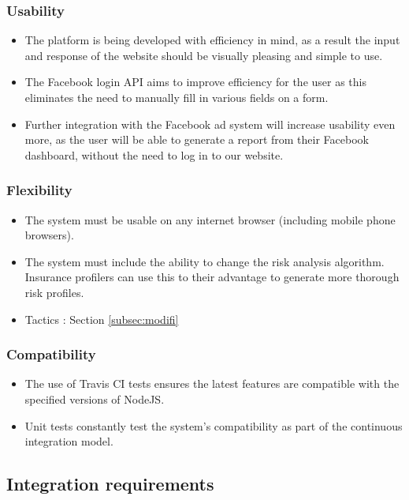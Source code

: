 \documentclass{article}
\begin{document}
		\subsubsection{Usability}
		\begin{itemize}
			\item The platform is being developed with efficiency in mind, as a result the input and response of the website should be visually pleasing and simple to use.
			\item The Facebook login API aims to improve efficiency for the user as this eliminates the need to manually fill in various fields on a form.
			\item Further integration with the Facebook ad system will increase usability even more, as the user will be able to generate a report from their Facebook dashboard, without the need to log in to our website.
		\end{itemize}

		\subsubsection{Flexibility}
		\begin{itemize}
			\item The system must be usable on any internet browser (including mobile phone browsers).
			\item The system must include the ability to change the risk analysis algorithm. Insurance profilers can use this to their advantage to generate more thorough risk profiles.
			\item Tactics : Section \ref{subsec:modifi}
		\end{itemize}

		\subsubsection{Compatibility}
		\begin{itemize}
			\item The use of Travis CI tests ensures the latest features are compatible with the specified versions of NodeJS.
			\item Unit tests constantly test the system's compatibility as part of the continuous integration model.
		\end{itemize}
		


	\subsection{Integration requirements}
\end{document}
